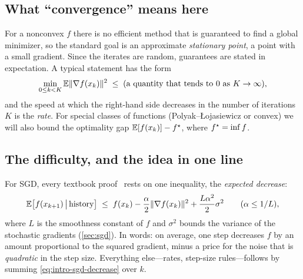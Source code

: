 \subsection{What ``convergence'' means here}

For a nonconvex $f$ there is no efficient method that is guaranteed to find a global
minimizer, so the standard goal is an approximate \emph{stationary point}, a point with a
small gradient. Since the iterates are random, guarantees are stated in expectation. A
typical statement has the form
\[
  \min_{0\le k<K}\mathbb{E}\lVert \nabla f(x_k)\rVert^2\;\le\;(\text{a quantity that tends to $0$ as
  $K\to\infty$}),
\]
and the speed at which the right-hand side decreases in the number of iterations $K$ is
the \emph{rate}. For special classes of functions (Polyak--{\L}ojasiewicz or convex) we
will also bound the optimality gap $\mathbb{E}[f(x_k)]-f^\star$, where $f^\star=\inf f$.

\subsection{The difficulty, and the idea in one line}

For SGD, every textbook proof~\cite{bottou2018,ghadimilan2013} rests on one inequality,
the \emph{expected decrease}:
\begin{equation}\label{eq:intro-sgd-decrease}
  \mathbb{E}\bigl[f(x_{k+1})\,\big|\,\text{history}\bigr]\;\le\;f(x_k)
  -\frac{\alpha}{2}\lVert \nabla f(x_k)\rVert^2+\frac{L\alpha^2}{2}\sigma^2
  \qquad(\alpha\le 1/L),
\end{equation}
where $L$ is the smoothness constant of $f$ and $\sigma^2$ bounds the variance of the
stochastic gradients (\cref{sec:sgd}). In words: on average, one step decreases $f$ by an
amount proportional to the squared gradient, minus a price for the noise that is
\emph{quadratic} in the step size. Everything else---rates, step-size rules---follows by
summing \eqref{eq:intro-sgd-decrease} over $k$.

